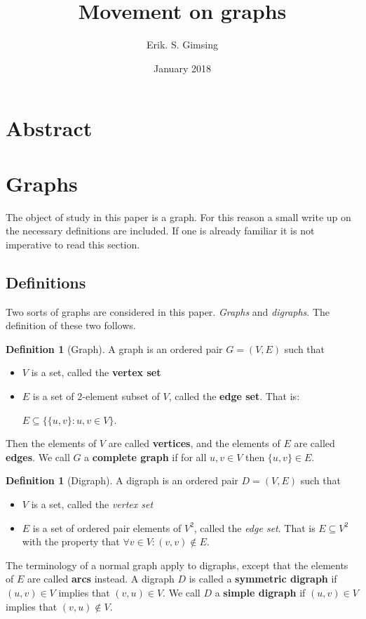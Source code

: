 \documentclass{article}
\title{Movement on graphs}
\author{Erik. S. Gimsing}
\date{January 2018}
\theoremstyle{plain}
\theoremstyle{definition}
\newtheorem{definition}[theorem]{Definition}
\begin{document}
\maketitle
\section{Abstract}
\section{Graphs}
The object of study in this paper is a graph. For this reason a small
write up on the necessary definitions are included. If one is already
familiar it is not imperative to read this section.
\subsection{Definitions}
Two sorts of graphs are considered in this paper. \textit{Graphs} and
\textit{digraphs}. The definition of these two follows.
\begin{definition}[Graph]\label{def graph}
	A graph is an ordered pair $G = (V,E)$ such that
	\begin{itemize}
		\item $V$ is a set, called the \textbf{vertex set}
		\item $E$ is a set of 2-element subset of $V$, called
		the \textbf{edge set}. That is:
			
			$E \subseteq \{\{u,v\}:u,v \in V\}$.
	\end{itemize}
	Then the elements of $V$ are called \textbf{vertices}, and
	the elements of $E$ are called \textbf{edges}. We call $G$
	a \textbf{complete graph} if for all $u,v\in V$ then $\{u,v\}
	\in E$.
\end{definition}
\begin{definition}[Digraph]\label{def digraph}
	A digraph is an ordered pair $D = (V,E)$ such that
	\begin{itemize}
		\item $V$ is a set, called the \textit{vertex set}
		\item $E$ is a set of ordered pair elements of $V^2$, 
			called the \textit{edge set}. That is $E 
			\subseteq V^2$ with the property that $\forall v 
			\in V: (v,v) \notin E$.
	\end{itemize}
	The terminology of a normal graph apply to digraphs, except
	that the elements of $E$ are called \textbf{arcs} instead. A
	digraph $D$ is called a \textbf{symmetric digraph} if $(u,v)
	\in V$ implies that $(v,u) \in V$. We call $D$ a \textbf{simple
	digraph} if $(u,v)\in V$ implies that $(v,u) \notin V$.
\end{definition}
\end{document}
